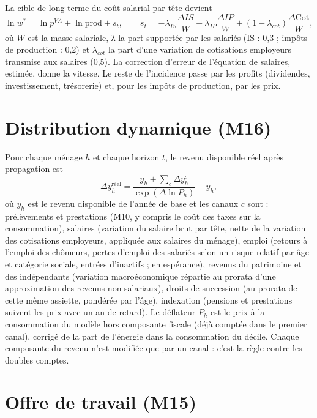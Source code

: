 La cible de long terme du coût salarial par tête devient
\begin{equation}
\ln w^* = \ln p^{VA} + \ln \text{prod} + s_t, \qquad s_t = -\lambda_{IS}\frac{\Delta IS}{W} - \lambda_{IP}\frac{\Delta IP}{W} + (1-\lambda_{cot})\frac{\Delta \text{Cot}}{W},
\end{equation}
où $W$ est la masse salariale, λ la part supportée par les salariés (IS : 0,3 ; impôts de production : 0,2) et
$\lambda_{cot}$ la part d'une variation de cotisations employeurs transmise aux salaires (0,5). La correction d'erreur
de l'équation de salaires, estimée, donne la vitesse. Le reste de l'incidence passe par les profits (dividendes,
investissement, trésorerie) et, pour les impôts de production, par les prix.

\section{Distribution dynamique (M16)}

Pour chaque ménage $h$ et chaque horizon $t$, le revenu disponible réel après propagation est
\begin{equation}
\Delta y^{\text{réel}}_h = \frac{y_h + \sum_c \Delta y^c_h}{\exp(\Delta \ln P_h)} - y_h,
\end{equation}
où $y_h$ est le revenu disponible de l'année de base et les canaux $c$ sont : prélèvements et prestations (M10, y
compris le coût des taxes sur la consommation), salaires (variation du salaire brut par tête, nette de la variation des
cotisations employeurs, appliquée aux salaires du ménage), emploi (retours à l'emploi des chômeurs, pertes d'emploi des
salariés selon un risque relatif par âge et catégorie sociale, entrées d'inactifs ; en espérance), revenus du
patrimoine et des indépendants (variation macroéconomique répartie au prorata d'une approximation des revenus non
salariaux), droits de succession (au prorata de cette même assiette, pondérée par l'âge), indexation (pensions et
prestations suivent les prix avec un an de retard). Le déflateur $P_h$ est le prix à la consommation du modèle hors
composante fiscale (déjà comptée dans le premier canal), corrigé de la part de l'énergie dans la consommation du
décile. Chaque composante du revenu n'est modifiée que par un canal : c'est la règle contre les doubles comptes.

\section{Offre de travail (M15)}

